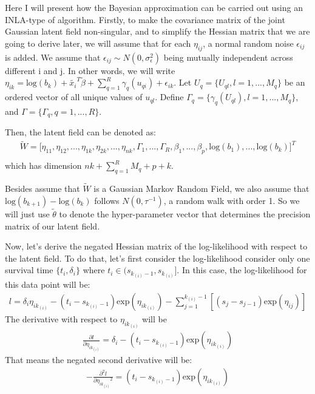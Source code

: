 \documentclass[]{article}
\begin{document}
Here I will present how the Bayesian approximation can be carried out
using an INLA-type of algorithm. Firstly, to make the covariance matrix
of the joint Gaussian latent field non-singular, and to simplify the
Hessian matrix that we are going to derive later, we will assume that
for each \(\eta_{ij}\), a normal random noise \(\epsilon_{ij}\) is
added. We assume that \(\epsilon_{ij} \sim N(0,\sigma^2_{\epsilon})\)
being mutually independent across different i and j. In other words, we
will write
\(\eta_{ik} = \text{log}(b_k)+\tilde{x_i}^T\tilde{\beta}+\sum_{q=1}^{R} \gamma_q(u_{qi})+\epsilon_{ik}\).
Let \(U_q = \{U_{ql},l=1,...,M_q\}\) be an ordered vector of all unique
values of \(u_{ql}\). Define
\(\Gamma_q = \{\gamma_{q}(U_{ql}), l=1,...,M_q\}\), and
\(\Gamma = \{\Gamma_q, q=1,...,R\}\).

Then, the latent field can be denoted as:
\begin{equation}\begin{aligned}\label{eqn:field1}
\tilde W = \big[\eta_{11},\eta_{12},...,\eta_{1k},\eta_{2k},...,\eta_{nk},\Gamma_1,...,\Gamma_R,\beta_1,...,\beta_p,\text{log}(b_1),...,\text{log}(b_k)\big]^T\\
\end{aligned}\end{equation} which has dimension
\(nk+\sum_{q=1}^{R}M_q + p +k\).

Besides assume that \(\tilde W\) is a Gaussian Markov Random Field, we
also assume that \(\text{log}(b_{k+1})-\text{log}(b_k)\) follows
\(N(0,\tau^{-1})\), a random walk with order 1. So we will just use
\(\tilde \theta\) to denote the hyper-parameter vector that determines
the precision matrix of our latent field.

Now, let's derive the negated Hessian matrix of the log-likelihood with
respect to the latent field. To do that, let's first consider the
log-likelihood consider only one survival time \(\{t_i,\delta_i\}\)
where \(t_i \in (s_{k_{(i)}-1},s_{k_{(i)}}]\). In this case, the
log-likelihood for this data point will be:
\begin{equation}\begin{aligned}\label{eqn:loglikeagain}
l = \delta_i \eta_{ik_{(i)}} - (t_i-s_{k_{(i)}-1})\text{exp}(\eta_{ik_{(i)}})-\sum_{j=1}^{k_{(i)}-1} [(s_{j}-s_{j-1})\text{exp}(\eta_{ij})]
\end{aligned}\end{equation} The derivative with respect to
\(\eta_{ik_{(i)}}\) will be\\
\begin{equation}\begin{aligned}\label{eqn:hessian}
\frac{\partial l}{\partial \eta_{ik_{(i)}}}= \delta_i -(t_i-s_{k_{(i)}-1})\text{exp}(\eta_{ik_{(i)}})
\end{aligned}\end{equation} That means the negated second derivative
will be: \begin{equation}\begin{aligned}\label{eqn:hessian1}
-\frac{\partial^2 l}{\partial {\eta_{ik_{(i)}}}^2} = (t_i-s_{k_{(i)}-1})\text{exp}(\eta_{ik_{(i)}})
\end{aligned}\end{equation}
\end{document}
